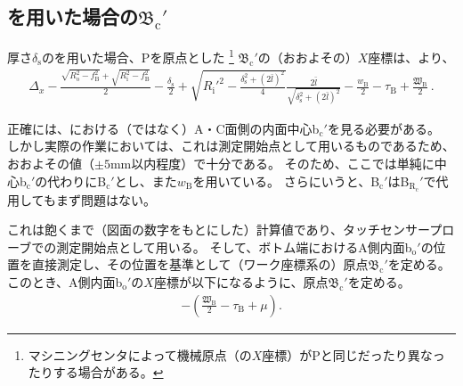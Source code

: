 \subsection[\Spacer を用いた場合の\texorpdfstring{$\mathfrak B_\mathrm c'$}{Bc'}]
           {\Spacer を用いた場合の$\boldsymbol{\mathfrak B_\mathrm c'}$}
厚さ$\delta_\mathrm s$の\Spacer を用いた場合、\TableCenter Pを原点とした
\footnote{マシニングセンタによって機械原点（の$X$座標）が\TableCenter Pと同じだったり異なったりする場合がある。}\relax
\BottomOutcutCenter$\mathfrak B_\mathrm c'$の（おおよその）$X$座標は、より、
\begin{align*}
  \Delta_x-\frac{\sqrt{R_\mathrm o^2-f_\mathrm B^2}+\sqrt{R_\mathrm i^2-f_\mathrm B^2}}2-\frac{\delta_\mathrm s}2
  +\sqrt{R_\mathrm i'^2-\frac{\delta_\mathrm s^2+(2\bar l)^2}4}\frac{2\bar l}{\sqrt{\delta_\mathrm s^2+(2\bar l)^2}}
  -\frac{w_\mathrm B}2-\tau_\mathrm B+\frac{\mathfrak W_\mathrm B}2\ .
\end{align*}
\begin{hosoku}
正確には、\nameBottomEndFace における（\InnerDiameter ではなく）A・C面側の内面中心b$_\mathrm c'$を見る必要がある。
しかし実際の作業においては、これは測定開始点として用いるものであるため、おおよその値（$\pm5$mm以内程度）で十分である。
そのため、ここでは単純に中心b$_\mathrm c'$の代わりに\BottomODCenter B$_\mathrm c'$とし、また\BottomEndACID$w_\mathrm B$を用いている。
さらにいうと、\BottomODCenter B$_\mathrm c'$は\BottomCurvatureCenter B$_{\mathrm R_\mathrm c}'$で代用してもまず問題はない。
\end{hosoku}
これは飽くまで（図面の数字をもとにした）計算値であり、タッチセンサープローブでの測定開始点として用いる。
そして、ボトム端におけるA側内面b$_\mathrm o'$の位置を直接測定し、その位置を基準として（ワーク座標系の）原点$\mathfrak B_\mathrm c'$を定める。
このとき、A側内面b$_\mathrm o'$の$X$座標が以下になるように、原点$\mathfrak B_\mathrm c'$を定める。
\begin{align*}
  -\left(\frac{\mathfrak W_\mathrm B}2-\tau_\mathrm B+\mu\right).
\end{align*}

